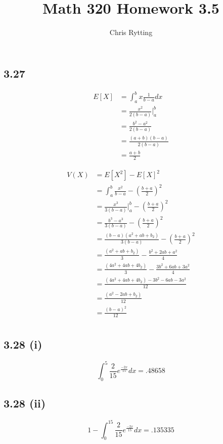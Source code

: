 \documentclass[letterpaper,12pt]{article}
\theoremstyle{definition}
\begin{document}
\title{Math 320 Homework 3.5}
\author{Chris Rytting}
\maketitle

\subsection*{3.27}
\begin{align*}
E[X] &= \int^{b}_{a} x \frac{1}{b-a}dx \\
&= \frac{x^2}{2(b-a)}\Big|^b_a \\
&= \frac{b^2 -a^2}{2(b-a)} \\
&= \frac{(a+b)(b-a)}{2(b-a)} \\
&= \frac{a+b}{2}
\end{align*}

\begin{align*}
    V(X) &= E[X^2] - E[X]^2 \\
    &= \int^{b}_{a} \frac{x^2}{b-a} - \left( \frac{b+a}{2} \right)^2\\
    &= \frac{x^3}{3(b-a)}\Big|^b_a - \left( \frac{b+a}{2} \right)^2\\
    &= \frac{b^3 - a^3}{3(b-a)} - \left( \frac{b+a}{2} \right)^2\\
    &= \frac{(b - a)(a^2 + ab + b_2)}{3(b-a)} - \left( \frac{b+a}{2} \right)^2\\
    &= \frac{(a^2 + ab + b_2)}{3} -  \frac{b^2 + 2ab +a^2}{4} \\
    &= \frac{(4a^2 + 4ab + 4b_2)}{3} -  \frac{3b^2 + 6ab +3a^2}{4} \\
    &= \frac{(4a^2 + 4ab + 4b_2) -  3b^2 - 6ab - 3a^2}{12} \\
    &= \frac{(a^2 -2ab + b_2)  }{12} \\
    &= \frac{(b-a)^2 }{12} \\
\end{align*}

\subsection*{3.28 (i)}

\[ \int^{5}_{0} \frac{2}{15}e^{\frac{-2x}{15}} dx = .48658\]

\subsection*{3.28 (ii)}

\[ 1 - \int^{15}_{0} \frac{2}{15} e^{\frac{-2x}{15}} dx = .135335\]
\end{document}
